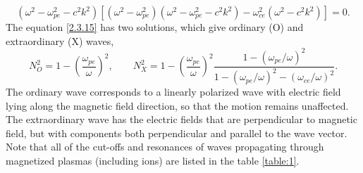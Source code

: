 \begin{equation}
\label{2.3.15}
\left( \omega^{2} - \omega_{pe}^{2} - c^{2} k^{2} \right) \left[ \left( \omega^{2} - \omega_{pe}^{2} \right) \left( \omega^{2} - \omega_{pe}^{2} - c^{2} k^{2} \right) - \omega_{ce}^{2} \left( \omega^{2} - c^{2} k^{2} \right) \right] = 0.
\end{equation}
The equation \ref{2.3.15} has two solutions, which give ordinary (O) and extraordinary (X) waves,
\begin{equation}
N_{O}^{2} = 1 - \left( \frac{\omega_{pe}}{\omega} \right)^{2}, \qquad N_{X}^{2} = 1 - \left( \frac{\omega_{pe}}{\omega} \right)^{2} \frac{1 - \left( \omega_{pe} / \omega\right)^{2}}{1 - \left( \omega_{pe} / \omega\right)^{2} - \left( \omega_{ce} / \omega\right)^{2}}.
\end{equation}
The ordinary wave corresponds to a linearly polarized wave with electric field lying along the magnetic field direction, so that the motion remains unaffected. The extraordinary wave has the electric fields that are perpendicular to magnetic field, but with components both perpendicular and parallel to the wave vector. Note that all of the cut-offs and resonances of waves propagating through magnetized plasmas (including ions) are listed in the table \ref{table:1}.
